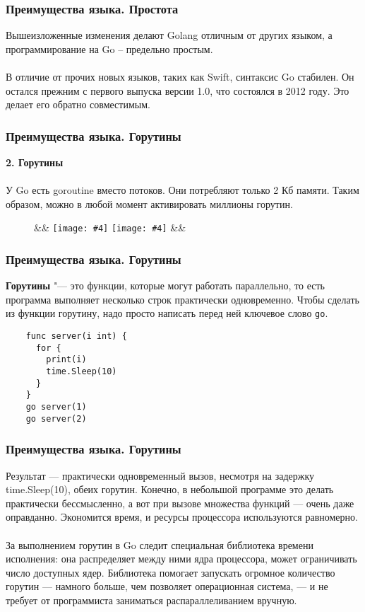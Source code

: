 \documentclass{beamer}
\newcommand{\imagebox}[6]{
      #1
      \begin{figure}[!ht]
          #2
          \ifx&#3&%
          \texttt{[image: \#4]}
          \else
          \texttt{[image: \#4]}
          \fi
          \ifx&#5&%
          \label{fig:#6}
          \else
          \caption{#5}\label{fig:#6}
          \fi
      \end{figure}
      #1 
      \phantom{imageboxfix}
  }
\begin{document}
\begin{frame}[fragile] \frametitle{Преимущества языка. Простота}
  Вышеизложенные изменения делают Golang отличным от других языком, а
  программирование на Go – предельно простым. 
  \\\\
  В отличие от прочих новых языков, таких как Swift, синтаксис Go стабилен. Он
  остался прежним с первого выпуска версии 1.0, что состоялся в 2012 году. Это
  делает его обратно совместимым.
  
\end{frame}
\begin{frame}[fragile] \frametitle{Преимущества языка. Горутины}
  \textbf{2. Горутины}
  \\\\
  У Go есть goroutine вместо потоков. Они потребляют только 2 Кб памяти. Таким
  образом, можно в любой момент активировать миллионы горутин.
  \imagebox{}{\centering}{}{resources/01-goroutines.jpg}{}{pic01}
\end{frame}
\begin{frame}[fragile] \frametitle{Преимущества языка. Горутины}
  \textbf{Горутины} "--- это функции, которые могут работать параллельно, то
  есть программа выполняет несколько строк практически одновременно. Чтобы
  сделать из функции горутину, надо просто написать перед ней ключевое слово 
  \verb|go|.
  \begin{verbatim}
    func server(i int) {
      for {
        print(i)
        time.Sleep(10)
      }
    }
    go server(1)
    go server(2)
  \end{verbatim}
\end{frame}
\begin{frame}[fragile] \frametitle{Преимущества языка. Горутины}
  Результат — практически одновременный вызов, несмотря на задержку
  time.Sleep(10), обеих горутин. Конечно, в небольшой программе это делать
  практически бессмысленно, а вот при вызове множества функций — очень даже
  оправданно. Экономится время, и ресурсы процессора используются равномерно.
  \\\\
  За выполнением горутин в Go следит специальная библиотека времени исполнения:
  она распределяет между ними ядра процессора, может ограничивать число
  доступных ядер. Библиотека помогает запускать огромное количество горутин —
  намного больше, чем позволяет операционная система, — и не требует от
  программиста заниматься распараллеливанием вручную.
\end{frame}
\end{document}
